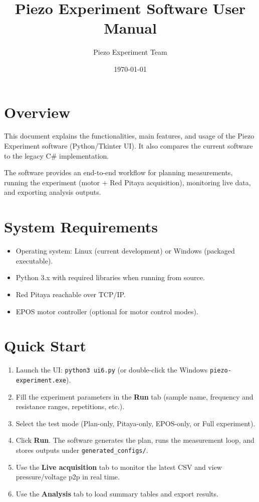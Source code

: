 \documentclass[11pt,a4paper]{article}
\title{Piezo Experiment Software User Manual}
\author{Piezo Experiment Team}
\date{\today}
\begin{document}
\maketitle

\section{Overview}
This document explains the functionalities, main features, and usage of the Piezo Experiment software (Python/Tkinter UI). It also compares the current software to the legacy C\# implementation.

The software provides an end-to-end workflow for planning measurements, running the experiment (motor + Red Pitaya acquisition), monitoring live data, and exporting analysis outputs.

\section{System Requirements}
\begin{itemize}[leftmargin=*]
\item Operating system: Linux (current development) or Windows (packaged executable).
\item Python 3.x with required libraries when running from source.
\item Red Pitaya reachable over TCP/IP.
\item EPOS motor controller (optional for motor control modes).
\end{itemize}

\section{Quick Start}
\begin{enumerate}
\item Launch the UI: \texttt{python3 ui6.py} (or double-click the Windows \texttt{piezo-experiment.exe}).
\item Fill the experiment parameters in the \textbf{Run} tab (sample name, frequency and resistance ranges, repetitions, etc.).
\item Select the test mode (Plan-only, Pitaya-only, EPOS-only, or Full experiment).
\item Click \textbf{Run}. The software generates the plan, runs the measurement loop, and stores outputs under \texttt{generated\_configs/}.
\item Use the \textbf{Live acquisition} tab to monitor the latest CSV and view pressure/voltage p2p in real time.
\item Use the \textbf{Analysis} tab to load summary tables and export results.
\end{enumerate}
\end{document}
